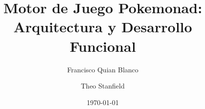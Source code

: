 \documentclass[12pt,a4paper]{article}
\title{Motor de Juego Pokemonad: Arquitectura y Desarrollo Funcional}
\author{Francisco Quian Blanco \and Theo Stanfield}
\date{\today}
\begin{document}


\tableofcontents
\newpage







\nocite{*}


\end{document}
